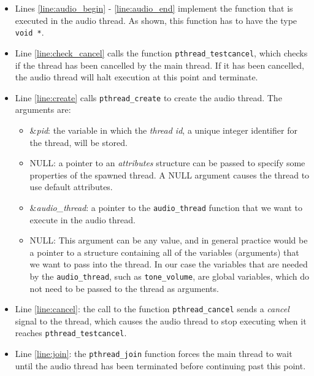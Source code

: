 \documentclass[epsfig,10pt,fullpage]{article}
\begin{document}
\begin{itemize}
\item Lines \ref{line:audio_begin} - \ref{line:audio_end} implement the function that is
executed in the audio thread. As shown, this function has to have the type \texttt{void *}.
\item Line \ref{line:check_cancel} calls the function \texttt{pthread\_testcancel}, which checks
if the thread has been cancelled by the main thread. If it has been cancelled, the
audio thread will halt execution at this point and terminate.
\item Line \ref{line:create} calls \texttt{pthread\_create} to create the audio thread. The
arguments are:
\begin{itemize}
\item \&{\it pid}: the variable in which the {\it thread id}, a unique integer identifier for the 
thread, will be stored.
\item NULL: a pointer to an {\it attributes} structure can be passed to specify some
properties of the spawned thread. A NULL argument causes the thread to use default attributes.
\item \&{\it audio\_thread}: a pointer to the \texttt{audio\_thread} function
that we want to execute in the audio thread.
\item NULL: This argument can be any value, and in general practice would be a pointer to
a structure containing all of the variables (arguments) that we want to pass into
the thread. In our case the variables that are needed by the \texttt{audio\_thread}, such
as \texttt{tone\_volume}, are global variables, which do not need to be passed to the thread
as arguments.
\end{itemize}
\item Line \ref{line:cancel}: the call to the function \texttt{pthread\_cancel} sends a
\textit{cancel} signal to the thread, which causes the audio thread to stop executing when
it reaches \texttt{pthread\_testcancel}.
\item Line \ref{line:join}: the \texttt{pthread\_join} function forces the main thread to wait
until the audio thread has been terminated before continuing past this point. 
\end{itemize}
\end{document}
